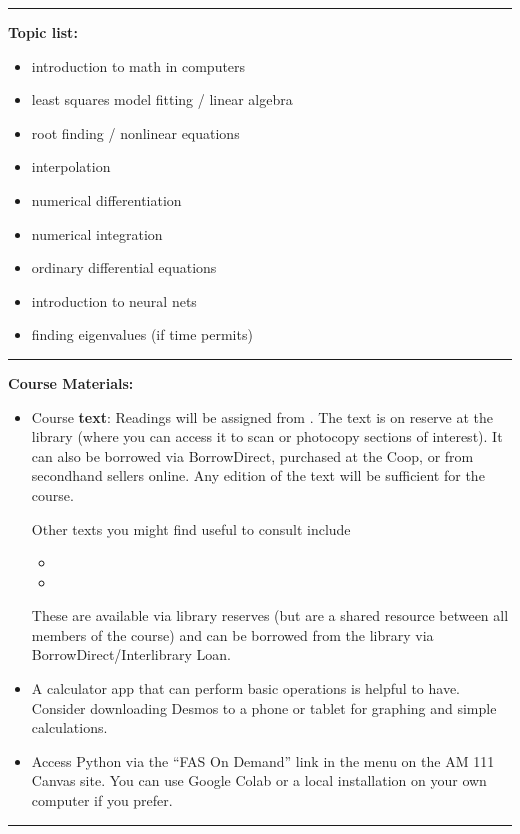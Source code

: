 \documentclass[12pt,letterpaper]{exam}
\begin{document}
\vspace{0.5cm}
\hrule
\vspace{0.5cm}

\noindent\textbf{Topic list:} 
\begin{itemize}
\itemsep0pt
    \item introduction to math in computers
    \item least squares model fitting / linear algebra
    \item root finding / nonlinear equations
    \item interpolation
    \item numerical differentiation
    \item numerical integration
    \item ordinary differential equations
    \item introduction to neural nets
    \item finding eigenvalues (if time permits)
\end{itemize}


\hrule
\vspace{0.5cm}

\noindent\textbf{Course Materials:} 
\begin{itemize}
\setlength\itemsep{0.08em}
\item Course \textbf{text}: Readings will be assigned from .  The text is on reserve at the library (where you can access it to scan or photocopy sections of interest).  It can also be borrowed via BorrowDirect, purchased at the Coop, or from secondhand sellers online.  Any edition of the text will be sufficient for the course.

Other texts you might find useful to consult include
\begin{itemize}
\itemsep0pt
    \item {}
    \item {}
\end{itemize}

These are available via library reserves (but are a shared resource between all members of the course) and can be borrowed from the library via BorrowDirect/Interlibrary Loan.

\item A calculator app that can perform basic operations is helpful to have.  Consider downloading Desmos to a phone or tablet for graphing and simple calculations.

\item Access Python via the ``FAS On Demand'' link in the menu on the AM 111 Canvas site.  You can use Google Colab or a local installation on your own computer if you prefer.
\end{itemize}
\hrule
\vspace{0.5cm}
\end{document}
